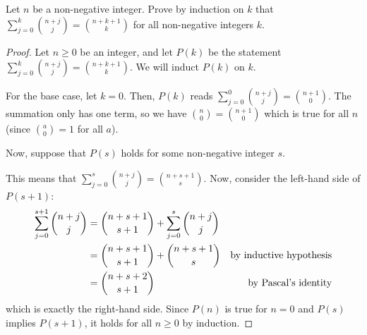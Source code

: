 \question Let $n$ be a non-negative integer.
Prove by induction on $k$ that $\sum^k_{j=0}\binom{n+j}{j} = \binom{n+k+1}{k}$
for all non-negative integers $k$.
\begin{proof}
  Let $n \geq 0$ be an integer, and let $P(k)$ be the statement $\sum^k_{j=0}\binom{n+j}{j} = \binom{n+k+1}{k}$.
  We will induct $P(k)$ on $k$.

  For the base case, let $k=0$.
  Then, $P(k)$ reads $\sum^0_{j=0}\binom{n+j}{j} = \binom{n+1}{0}$.
  The summation only has one term, so we have $\binom{n}{0} = \binom{n+1}{0}$ which is true for all $n$ (since $\binom{a}{0} = 1$ for all $a$).

  Now, suppose that $P(s)$ holds for some non-negative integer $s$.

  This means that $\sum^s_{j=0}\binom{n+j}{j} = \binom{n+s+1}{s}$.
  Now, consider the left-hand side of $P(s+1)$:
  \begin{align*}
    \sum^{s+1}_{j=0}\binom{n+j}{j}
     & = \binom{n+s+1}{s+1} + \sum^s_{j=0}\binom{n+j}{j} \\
     & = \binom{n+s+1}{s+1} + \binom{n+s+1}{s} & \text{by inductive hypothesis}       \\
     & = \binom{n+s+2}{s+1} & \text{by Pascal's identity}
  \end{align*}
  which is exactly the right-hand side.
  Since $P(n)$ is true for $n=0$ and $P(s)$ implies $P(s+1)$, it holds for all $n \geq 0$ by induction.
\end{proof}


